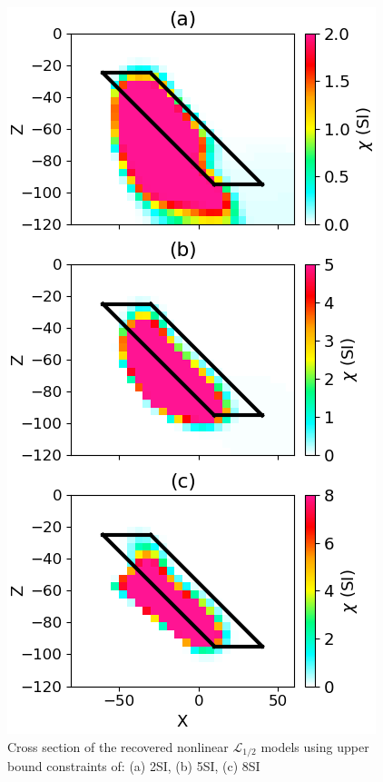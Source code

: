 \begin{figure}[htb]
    \vspace{-0.1cm}
    \begin{center}
    \includegraphics[width=\columnwidth]{figures/Lpbound.png}
    \end{center}
    \vspace{-0.5cm}
\caption{
    Cross section of the recovered nonlinear $\mathcal{L}_{1/2}$ models using upper bound constraints of: (a) 2SI, (b) 5SI, (c) 8SI
}
\label{fig:Lp5bound}
\vspace{-0.1cm}
\end{figure}